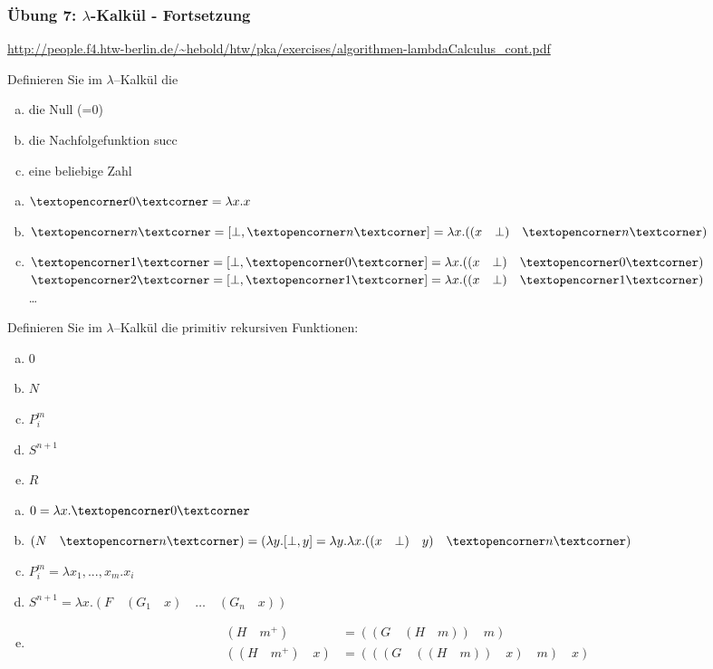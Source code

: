 \begin{card}
	\frametitle{Übung 7: $\lambda$-Kalkül - Fortsetzung}
	\url{http://people.f4.htw-berlin.de/~hebold/htw/pka/exercises/algorithmen-lambdaCalculus_cont.pdf}
\end{card}

\begin{card}
	Definieren Sie im $\lambda$–Kalkül die
	\begin{enumerate}[a)]
    \item die Null (=0)
    \item die Nachfolgefunktion succ
    \item eine beliebige Zahl
	\end{enumerate}
	\hr
	\begin{enumerate}[a)]
    \item $\lambdanumber{0} = \lambda x.x$
    \item $\lambdanumber{n} = [\bot, \lambdanumber{n}] = \lambda x.((x \quad \bot) \quad \lambdanumber{n})$
    \item $\lambdanumber{1} = [\bot, \lambdanumber{0}] = \lambda x.((x \quad \bot) \quad \lambdanumber{0})$\\
          $\lambdanumber{2} = [\bot, \lambdanumber{1}] = \lambda x.((x \quad \bot) \quad \lambdanumber{1})$\\
        \dots
	\end{enumerate}
\end{card}

\begin{card}
	Definieren Sie im $\lambda$–Kalkül die primitiv rekursiven Funktionen:
	\begin{enumerate}[a)]
    \item $0$
    \item $N$
    \item $P^m_i$
    \item $S^{n+1}$
    \item $R$
	\end{enumerate}
	\hr
	\begin{enumerate}[a)]
    \item $0 = \lambda x.\lambdanumber{0}$
    \item $(N \quad \lambdanumber{n}) = (\lambda y.[\bot, y] = \lambda y.\lambda x.((x \quad \bot) \quad y) \quad \lambdanumber{n})$\\
    \item $P^m_i = \lambda x_1,...,x_m.x_i$
    \item $S^{n+1} = \lambda x.(F \quad (G_1 \quad x) \quad \ldots \quad (G_n \quad x))$
    \item
      \begin{align*}
        (H \quad m^+) &= ((G \quad (H \quad m)) \quad m) \\
        ((H \quad m^+) \quad x) &= (((G \quad ((H \quad m)) \quad x) \quad m) \quad x)
      \end{align*}
	\end{enumerate}
\end{card}

